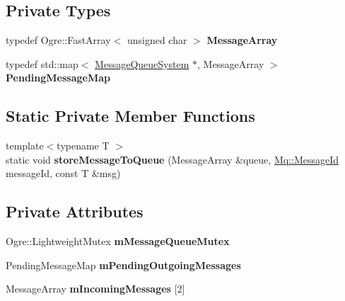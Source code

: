 \subsection*{Private Types}
\begin{DoxyCompactItemize}
\item 
\mbox{\label{class_common_1_1_mq_1_1_message_queue_system_a36ef39384450cb9f027aa9b09ae06034}} 
typedef Ogre\+::\+Fast\+Array$<$ unsigned char $>$ {\bfseries Message\+Array}
\item 
\mbox{\label{class_common_1_1_mq_1_1_message_queue_system_a0de51c98004bd121fcae2ace2fdb28d7}} 
typedef std\+::map$<$ \hyperlink{class_common_1_1_mq_1_1_message_queue_system}{Message\+Queue\+System} $\ast$, Message\+Array $>$ {\bfseries Pending\+Message\+Map}
\end{DoxyCompactItemize}
\subsection*{Static Private Member Functions}
\begin{DoxyCompactItemize}
\item 
\mbox{\label{class_common_1_1_mq_1_1_message_queue_system_ad92c12ef9927d9534d3575929aef5ec0}} 
{\footnotesize template$<$typename T $>$ }\\static void {\bfseries store\+Message\+To\+Queue} (Message\+Array \&queue, \hyperlink{group___common_gaa8c87d2b450282716c906da283e149e6}{Mq\+::\+Message\+Id} message\+Id, const T \&msg)
\end{DoxyCompactItemize}
\subsection*{Private Attributes}
\begin{DoxyCompactItemize}
\item 
\mbox{\label{class_common_1_1_mq_1_1_message_queue_system_aa5491126000d094951d933a780d8c92d}} 
Ogre\+::\+Lightweight\+Mutex {\bfseries m\+Message\+Queue\+Mutex}
\item 
\mbox{\label{class_common_1_1_mq_1_1_message_queue_system_a987ec96d98e48eb3b8176da9c5c56788}} 
Pending\+Message\+Map {\bfseries m\+Pending\+Outgoing\+Messages}
\item 
\mbox{\label{class_common_1_1_mq_1_1_message_queue_system_a98b14d23055f603fbdad7563ce506334}} 
Message\+Array {\bfseries m\+Incoming\+Messages} \mbox{[}2\mbox{]}
\end{DoxyCompactItemize}
